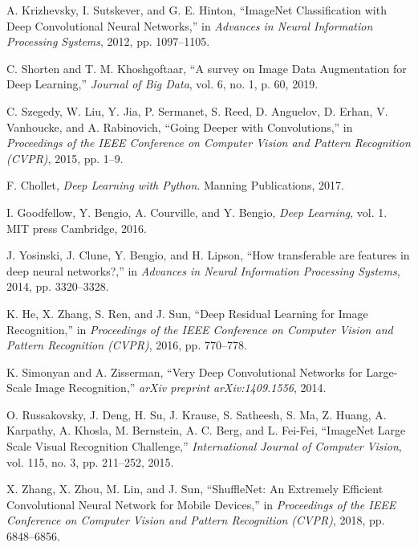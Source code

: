 \documentclass{article}
\begin{document}
\begin{thebibliography}{9}

A. Krizhevsky, I. Sutskever, and G. E. Hinton, ``ImageNet Classification with Deep Convolutional Neural Networks,'' in \textit{Advances in Neural Information Processing Systems}, 2012, pp. 1097–1105.

C. Shorten and T. M. Khoshgoftaar, ``A survey on Image Data Augmentation for Deep Learning,'' \textit{Journal of Big Data}, vol. 6, no. 1, p. 60, 2019.

C. Szegedy, W. Liu, Y. Jia, P. Sermanet, S. Reed, D. Anguelov, D. Erhan, V. Vanhoucke, and A. Rabinovich, ``Going Deeper with Convolutions,'' in \textit{Proceedings of the IEEE Conference on Computer Vision and Pattern Recognition (CVPR)}, 2015, pp. 1–9.

F. Chollet, \textit{Deep Learning with Python}. Manning Publications, 2017.

I. Goodfellow, Y. Bengio, A. Courville, and Y. Bengio, \textit{Deep Learning}, vol. 1. MIT press Cambridge, 2016.

J. Yosinski, J. Clune, Y. Bengio, and H. Lipson, ``How transferable are features in deep neural networks?,'' in \textit{Advances in Neural Information Processing Systems}, 2014, pp. 3320–3328.

K. He, X. Zhang, S. Ren, and J. Sun, ``Deep Residual Learning for Image Recognition,'' in \textit{Proceedings of the IEEE Conference on Computer Vision and Pattern Recognition (CVPR)}, 2016, pp. 770–778.


K. Simonyan and A. Zisserman, ``Very Deep Convolutional Networks for Large-Scale Image Recognition,'' \textit{arXiv preprint arXiv:1409.1556}, 2014.

O. Russakovsky, J. Deng, H. Su, J. Krause, S. Satheesh, S. Ma, Z. Huang, A. Karpathy, A. Khosla, M. Bernstein, A. C. Berg, and L. Fei-Fei, ``ImageNet Large Scale Visual Recognition Challenge,'' \textit{International Journal of Computer Vision}, vol. 115, no. 3, pp. 211–252, 2015.

X. Zhang, X. Zhou, M. Lin, and J. Sun, ``ShuffleNet: An Extremely Efficient Convolutional Neural Network for Mobile Devices,'' in \textit{Proceedings of the IEEE Conference on Computer Vision and Pattern Recognition (CVPR)}, 2018, pp. 6848–6856.

\end{thebibliography}
\end{document}
